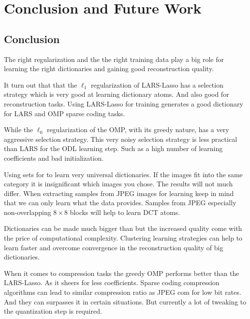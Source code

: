 \chapter{Conclusion and Future Work}

\section{Conclusion}
The right regularization and the the right training data
play a big role for learning the right dictionaries and gaining
good reconstruction quality. 

It turn out that that the $\ell_1$ regularization of LARS-Lasso has a selection
strategy which is very good at learning dictionary atoms.  And also good for
reconstruction tasks. Using LARS-Lasso for training generates a good dictionary
for LARS and OMP sparse coding tasks.

While the $\ell_0$ regularization of the OMP, with its greedy nature, has a very
aggressive selection strategy.  This very noisy selection strategy is less
practical than LARS for the ODL learning step. Such as a high number of learning
coefficients and bad initialization. 


Using  sets for to learn very universal dictionaries. If the images fit into the
same category it is insignificant which images you chose. The results will not
much differ. When extracting samples from JPEG images for learning keep in mind 
that we can only learn what the data provides. Samples from JPEG especially
non-overlapping $8 \times 8$ blocks will help to learn DCT atoms.


Dictionaries can be made much bigger than but the increased quality come with
the price of computational complexity. Clustering learning strategies can help
to learn faster and overcome convergence in the reconstruction quality of big
dictionaries.

When it comes to compression tasks the greedy OMP performs better
than the LARS-Lasso. As it sheers for less coefficients. Sparse coding 
compression algorithms can lead to similar compression ratio as JPEG com
for low bit rates. And they can surpasses it in certain situations. But
currently a lot of tweaking to the quantization step is required. 

